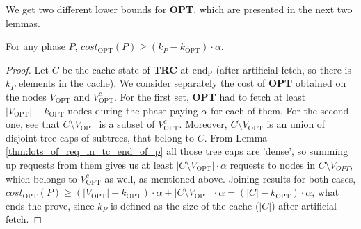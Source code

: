We get two different lower bounds for \textbf{OPT}, which are presented in the
next two lemmas.  \begin{lemma} For any phase $P$, $cost_{\mathrm{OPT}}(P) \geq
(k_P - k_{\mathrm{OPT}}) \cdot \alpha$.  \label{thm:opt_bound_with_k}
\end{lemma} \begin{proof} Let $C$ be the cache state of \textbf{TRC} at
$\mathrm{end_P}$ (after artificial fetch, so there is $k_P$ elements in the
cache). We consider separately the cost of \textbf{OPT} obtained on the nodes
$V_{\mathrm{OPT}}$ and $V_{\mathrm{OPT}}^c$. For the first set, \textbf{OPT} had
to fetch at least $|V_{\mathrm{OPT}}| - k_{\mathrm{OPT}}$ nodes during the phase
paying $\alpha$ for each of them. For the second one, see that $C \setminus
V_{\mathrm{OPT}}$ is a subset of $V_{\mathrm{OPT}}^c$. Moreover, $C \setminus
V_{\mathrm{OPT}}$ is an union of disjoint tree caps of subtrees, that belong to
$C$. From Lemma \ref{thm:lots_of_req_in_tc_end_of_p} all those tree caps are
'dense', so summing up requests from them gives us at least $|C \setminus
V_{\mathrm{OPT}}| \cdot \alpha$ requests to nodes in $C \setminus V_{OPT}$,
which belongs to $V_{\mathrm{OPT}}^c$ as well, as mentioned above. Joining
results for both cases, $cost_{\mathrm{OPT}}(P) \geq (|V_{\mathrm{OPT}}| -
k_{\mathrm{OPT}}) \cdot \alpha + |C \setminus V_{\mathrm{OPT}}| \cdot \alpha =
(|C| - k_{\mathrm{OPT}}) \cdot \alpha$, what ends the prove, since $k_P$ is
defined as the size of the cache ($|C|$) after artificial fetch.  \end{proof}
